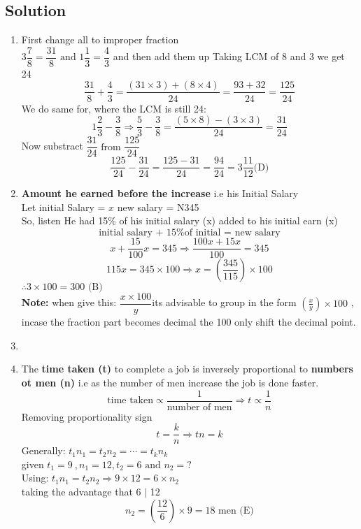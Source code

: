 \subsection{Solution}
\begin{multicols}{2}
\begin{enumerate}[label={\arabic*.}]
    \item First change all to improper fraction \\
    \(3\dfrac{7}{8} = \dfrac{31}{8} \text { and } 1\dfrac{1}{3} = \dfrac{4}{3}\) and then add them up 
    Taking LCM of 8 and 3 we get 24
    \[\frac{31}{8} + \frac{4}{3} = \frac{(31 \times 3) + (8 \times 4) }{24} = \frac{93 + 32}{24} = \dfrac{125}{24} \]
    We do same for, where the LCM is still 24: 
    \[1\frac{2}{3} - \frac{3}{8} \Rightarrow \frac{5}{3} - \frac{3}{8} = \frac{(5 \times 8) - (3 \times 3)}{24} = \frac{31}{24}\]
    Now substract \(\dfrac{31}{24} \text { from } \dfrac{125}{24}\)
    \[\frac{125}{24} - \frac{31}{24} = \frac{125 - 31}{24} = \frac{94}{24} = 3\frac{11}{12} \text{(D)} \]
    
    \item \textbf{Amount he earned before the increase} i.e his Initial Salary \\
    Let initial Salary = \(x\) \hspace {10px}  new salary = N345\\
    So, listen He had 15\% of his initial salary (x) added to his initial earn (x)
    \[\text{initial salary + 15\% of initial = new salary}\]
    \[x + \dfrac{15}{100}x = 345 \Rightarrow \dfrac{100x + 15x}{100} = 345\]
    \[115x = 345 \times 100 \Rightarrow x = \left(\frac{345}{115}\right) \times 100\]
    \(\therefore 3 \times 100 = 300 \text{ (B)}\)\\
    \textbf{Note:} when give this: \( \dfrac{x \times 100}{y}\)its advisable to group in the form
    \(\left(\frac{x}{y}\right) \times 100\) , incase the fraction part becomes decimal the 100 only shift the
    decimal point. 

    \item
    \item The \textbf{time taken (t)} to complete a job is inversely proportional to \textbf{numbers ot men (n)} 
    i.e as the number of men increase the job is done faster. 
    \begin{equation}
        \text{time taken} \propto \dfrac{1}{\text{number of men}} \Rightarrow t \propto \dfrac{1}{n}
    \end {equation}
    Removing proportionality sign
    \[t = \dfrac{k}{n} \Rightarrow tn = k\]
    Generally: \(t_{1}n_{1} = t_{2}n_2 = \cdots = t_{k}n_{k}\)\\
    given \(t_{1} = 9\ , n_{1} = 12 , t_{2} = 6 \text{ and } n_{2} = ?\) \\
    Using: \(t_{1}n_{1} = t_{2}n_{2} \Rightarrow 9 \times 12 = 6 \times n_{2}\) \\
    taking the advantage that 6 $\mid$ 12 
    \[n_{2} = \left(\frac{12}{6}\right) \times 9 = 18 \text { men (E)}\]


\end{enumerate}
\end{multicols}
